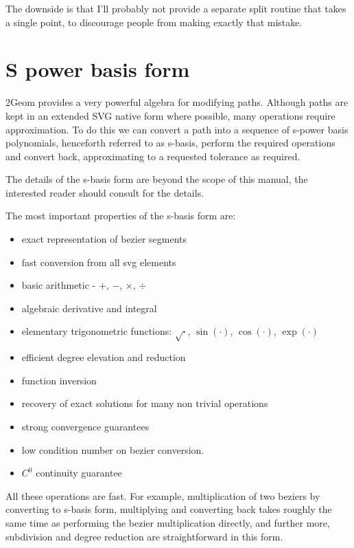 The downside is that I'll probably not provide a separate split
routine that takes a single point, to discourage people from making
exactly that mistake.

\section{S power basis form}

2Geom provides a very powerful algebra for modifying paths.  Although
paths are kept in an extended SVG native form where possible, many
operations require approximation.  To do this we can convert a path
into a sequence of s-power basis polynomials, henceforth referred to
as s-basis, perform the required operations and convert back,
approximating to a requested tolerance as required.

The details of the s-basis form are beyond the scope of this manual,
the interested reader should consult \cite{SanchezReyes1997,SanchezReyes2000,SanchezReyes2001,SanchezReyes2003,SanchezReyes2004} for the details.

The most important properties of the s-basis form are:
\begin{itemize}
\item exact representation of bezier segments
\item fast conversion from all svg elements
\item basic arithmetic - $+$, $-$, $\times$, $\div$
\item algebraic derivative and integral
\item elementary trigonometric functions: $\sqrt{\cdot}$, $\sin(\cdot)$, $\cos(\cdot)$, $\exp(\cdot)$
\item efficient degree elevation and reduction
\item function inversion
\item recovery of exact solutions for many non trivial operations
\item strong convergence guarantees
\item low condition number on bezier conversion.
\item $C^0$ continuity guarantee
\end{itemize}

All these operations are fast.  For example, multiplication of two
beziers by converting to s-basis form, multiplying and converting back
takes roughly the same time as performing the bezier multiplication
directly, and further more, subdivision and degree reduction are
straightforward in this form.


